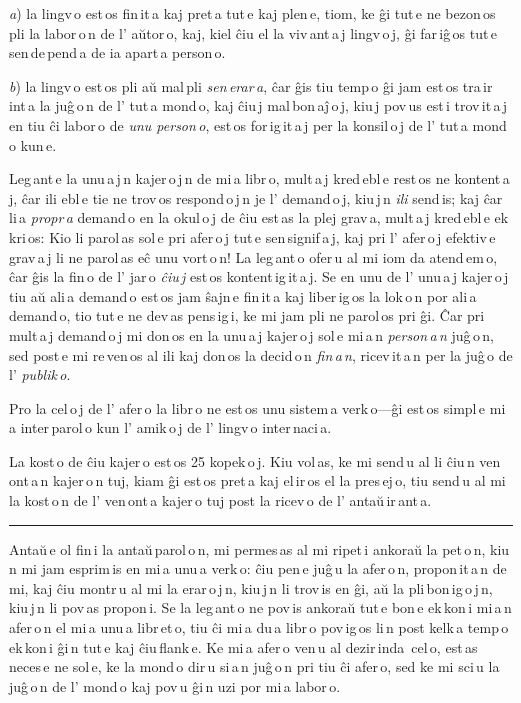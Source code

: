 \documentclass[ngerman,12pt,twoside]{book}
\begin{document}
\emph{a}) la lingv\,o est\,os fin\,it\,a kaj pret\,a tut\,e kaj plen\,e, tiom, ke ĝi tut\,e ne bezon\,os pli la labor\,o\,n de l' aŭtor\,o, kaj, kiel ĉiu el la viv\,ant\,a\,j lingv\,o\,j, ĝi far\,iĝ\,os tut\,e sen\,de\,pend\,a de ia apart\,a person\,o.

\emph{b}) la lingv\,o est\,os pli aŭ mal\,pli \emph{sen\,erar\,a}, ĉar ĝis tiu temp\,o ĝi jam est\,os tra\,ir\,int\,a la juĝ\,o\,n de l' tut\,a mond\,o, kaj ĉiu\,j mal\,bon\,aĵ\,o\,j, kiu\,j pov\,us est\,i trov\,it\,a\,j en tiu ĉi labor\,o de \emph{unu person\,o}, est\,os for\,ig\,it\,a\,j per la konsil\,o\,j de l' tut\,a mond\,o kun\,e.

Leg\,ant\,e la unu\,a\,j\,n kajer\,o\,j\,n de mi\,a libr\,o, mult\,a\,j kred\,ebl\,e rest\,os ne kontent\,a\,j, ĉar ili ebl\,e tie ne trov\,os respond\,o\,j\,n je l' demand\,o\,j, kiu\,j\,n \emph{ili} send\,is; kaj ĉar li\,a \emph{propr\,a} demand\,o en la okul\,o\,j de ĉiu est\,as la plej grav\,a, mult\,a\,j kred\,ebl\,e ek\,kri\,os: \glqq{}Kio li parol\,as sol\,e pri afer\,o\,j tut\,e sen\,signif\,a\,j, kaj pri l' afer\,o\,j efektiv\,e grav\,a\,j li ne parol\,as eĉ unu vort\,o\,n!\grqq{} La leg\,ant\,o ofer\,u al mi iom da atend\,em\,o, ĉar ĝis la fin\,o de l' jar\,o \emph{ĉiu\,j} est\,os kontent\,ig\,it\,a\,j. Se en unu de l' unu\,a\,j kajer\,o\,j tiu aŭ ali\,a demand\,o est\,os jam ŝajn\,e fin\,it\,a kaj liber\,ig\,os la lok\,o\,n por ali\,a demand\,o, tio tut\,e ne dev\,as pens\,ig\,i, ke mi jam pli ne parol\,os pri ĝi. Ĉar pri mult\,a\,j demand\,o\,j mi don\,os en la unu\,a\,j kajer\,o\,j sol\,e mi\,a\,n \emph{person\,a\,n} juĝ\,o\,n, sed post\,e mi re\,ven\,os al ili kaj don\,os la decid\,o\,n \emph{fin\,a\,n}, ricev\,it\,a\,n per la juĝ\,o de l' \emph{publik\,o}.

Pro la cel\,o\,j de l' afer\,o la libr\,o ne est\,os unu sistem\,a verk\,o---ĝi est\,os simpl\,e mi\,a inter\,parol\,o kun l' amik\,o\,j de l' lingv\,o inter\,naci\,a.

La kost\,o de ĉiu kajer\,o est\,os 25 kopek\,o\,j. Kiu vol\,as, ke mi send\,u al li ĉiu\,n ven\,ont\,a\,n kajer\,o\,n tuj, kiam ĝi est\,os pret\,a kaj el\,ir\,os el la pres\,ej\,o, tiu send\,u al mi la kost\,o\,n de l' ven\,ont\,a kajer\,o tuj post la ricev\,o de l' antaŭ\,ir\,ant\,a.

\begin{center}
\rule{0.2\textwidth}{0.4pt}
\end{center}

Antaŭ\,e ol fin\,i la antaŭ\,parol\,o\,n, mi permes\,as al mi ripet\,i ankoraŭ la pet\,o\,n, kiu\,n mi jam esprim\,is en mi\,a unu\,a verk\,o: ĉiu pen\,e juĝ\,u la afer\,o\,n, propon\,it\,a\,n de mi, kaj ĉiu montr\,u al mi la erar\,o\,j\,n, kiu\,j\,n li trov\,is en ĝi, aŭ la pli\,bon\,ig\,o\,j\,n, kiu\,j\,n li pov\,as propon\,i. Se la leg\,ant\,o ne pov\,is ankoraŭ tut\,e bon\,e ek\,kon\,i mi\,a\,n afer\,o\,n el mi\,a unu\,a libr\,et\,o, tiu ĉi mi\,a du\,a libr\,o pov\,ig\,os li\,n post kelk\,a temp\,o ek\,kon\,i ĝi\,n tut\,e kaj ĉiu\,flank\,e. Ke mi\,a afer\,o ven\,u al dezir\,inda\, cel\,o, est\,as neces\,e ne sol\,e, ke la mond\,o dir\,u si\,a\,n juĝ\,o\,n pri tiu ĉi afer\,o, sed ke mi sci\,u la juĝ\,o\,n de l' mond\,o kaj pov\,u ĝi\,n uzi por mi\,a labor\,o.
\end{document}
